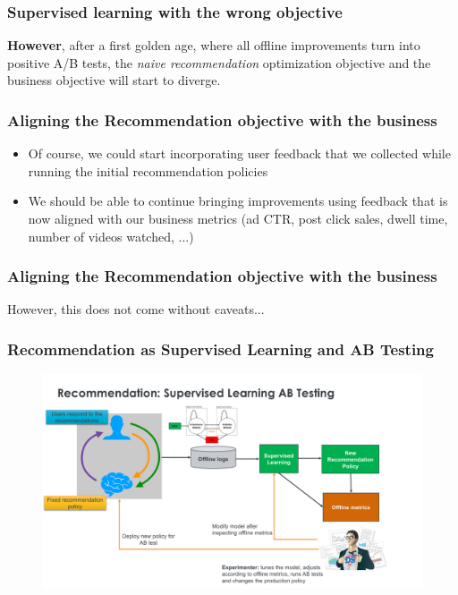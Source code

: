   
  \begin{frame}
    \frametitle{Supervised learning with the wrong objective}
  
  \textbf{However}, after a first golden age, where all offline improvements turn into positive A/B tests, the \emph{naive recommendation} optimization objective and the business objective will start to diverge.
  
  \end{frame}
  
  
  \begin{frame}
    \frametitle{Aligning the Recommendation objective with the business}
  
  \begin{itemize}
  \item Of course, we could start incorporating user feedback that we collected while running the initial recommendation policies  
  \item We should be able to continue bringing improvements using feedback that is now aligned with our business metrics (ad CTR, post click sales, dwell time, number of videos watched, ...)
  \end{itemize}
  
  \end{frame}
  
  
  \begin{frame}
    \frametitle{Aligning the Recommendation objective with the business}
  
    However, this does not come without caveats...
  
  \end{frame}
  
  
  \begin{frame}
    \frametitle{Recommendation as Supervised Learning and AB Testing}
   
   
     \begin{figure}[h!]
       \includegraphics[scale=0.3]{images/recoasabtesting0.png}
         \centering
         \label{motex1}
     \end{figure}
       
   \end{frame}
  
